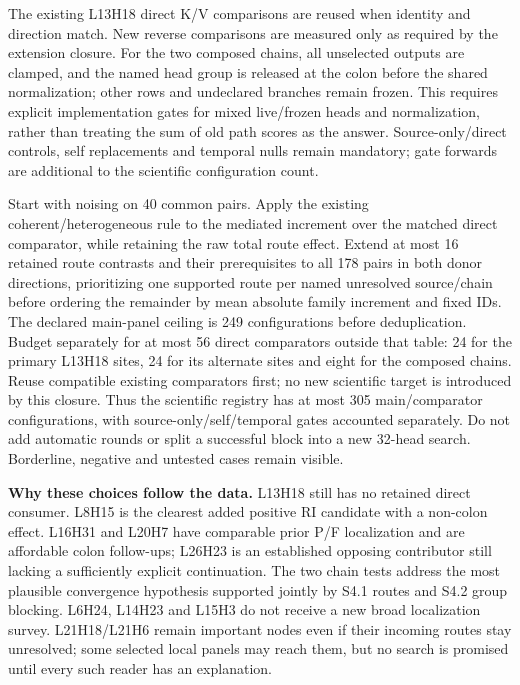 The existing L13H18 direct K/V comparisons are reused when identity and direction match. New reverse comparisons are measured only as required by the extension closure. For the two composed chains, all unselected outputs are clamped, and the named head group is released at the colon before the shared normalization; other rows and undeclared branches remain frozen. This requires explicit implementation gates for mixed live/frozen heads and normalization, rather than treating the sum of old path scores as the answer. Source-only/direct controls, self replacements and temporal nulls remain mandatory; gate forwards are additional to the scientific configuration count.

Start with noising on 40 common pairs. Apply the existing coherent/heterogeneous rule to the mediated increment over the matched direct comparator, while retaining the raw total route effect. Extend at most 16 retained route contrasts and their prerequisites to all 178 pairs in both donor directions, prioritizing one supported route per named unresolved source/chain before ordering the remainder by mean absolute family increment and fixed IDs. The declared main-panel ceiling is 249 configurations before deduplication. Budget separately for at most 56 direct comparators outside that table: 24 for the primary L13H18 sites, 24 for its alternate sites and eight for the composed chains. Reuse compatible existing comparators first; no new scientific target is introduced by this closure. Thus the scientific registry has at most 305 main/comparator configurations, with source-only/self/temporal gates accounted separately. Do not add automatic rounds or split a successful block into a new 32-head search. Borderline, negative and untested cases remain visible.

\textbf{Why these choices follow the data.} L13H18 still has no retained direct consumer. L8H15 is the clearest added positive RI candidate with a non-colon effect. L16H31 and L20H7 have comparable prior P/F localization and are affordable colon follow-ups; L26H23 is an established opposing contributor still lacking a sufficiently explicit continuation. The two chain tests address the most plausible convergence hypothesis supported jointly by S4.1 routes and S4.2 group blocking. L6H24, L14H23 and L15H3 do not receive a new broad localization survey. L21H18/L21H6 remain important nodes even if their incoming routes stay unresolved; some selected local panels may reach them, but no search is promised until every such reader has an explanation.

